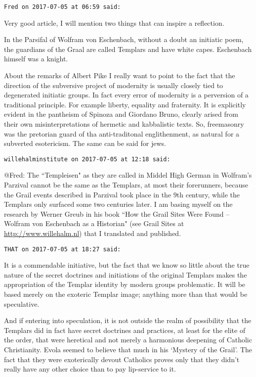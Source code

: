 \begin{footnotesize}
\begin{sffamily}
\hfill

\texttt{Fred on 2017-07-05 at 06:59 said: }

Very good article, I will mention two things that can inspire a reflection.

In the Parsifal of Wolfram von Eschenbach, without a doubt an initiatic poem, the guardians of the Graal are called Templars and have white capes. Eschenbach himself was a knight.

About the remarks of Albert Pike I really want to point to the fact that the direction of the subversive project of modernity is usually closely tied to degenerated initiatic groups. In fact every error of modernity is a perversion of a traditional principle. For example liberty, equality and fraternity. It is explicitly evident in the pantheism of Spinoza and Giordano Bruno, clearly arised from their own misinterpretations of hermetic and kabbalistic texts. So, freemasonry was the pretorian guard of tha anti-traditonal englithenment, as natural for a subverted esotericism. The same can be said for jews.


\hfill

\texttt{willehalminstitute on 2017-07-05 at 12:18 said: }

@Fred: The ``Templeisen" as they are called in Middel High German in Wolfram's Parzival cannot be the same as the Templars, at most their forerunners, because the Grail events described in Parzival took place in the 9th century, while the Templars only surfaced some two centuries later. I am basing myself on the research by Werner Greub in his book ``How the Grail Sites Were Found – Wolfram von Eschenbach as a Historian" (see Grail Sites at \url{http://www.willehalm.nl}) that I translated and published.


\hfill

\texttt{THAT on 2017-07-05 at 18:27 said: }

It is a commendable initiative, but the fact that we know so little about the true nature of the secret doctrines and initiations of the original Templars makes the appropriation of the Templar identity by modern groups problematic. It will be based merely on the exoteric Templar image; anything more than that would be speculative. 

And if entering into speculation, it is not outside the realm of possibility that the Templars did in fact have secret doctrines and practices, at least for the elite of the order, that were heretical and not merely a harmonious deepening of Catholic Christianity. Evola seemed to believe that much in his `Mystery of the Grail'. The fact that they were exoterically devout Catholics proves only that they didn't really have any other choice than to pay lip-service to it.


\end{sffamily}
\end{footnotesize}
